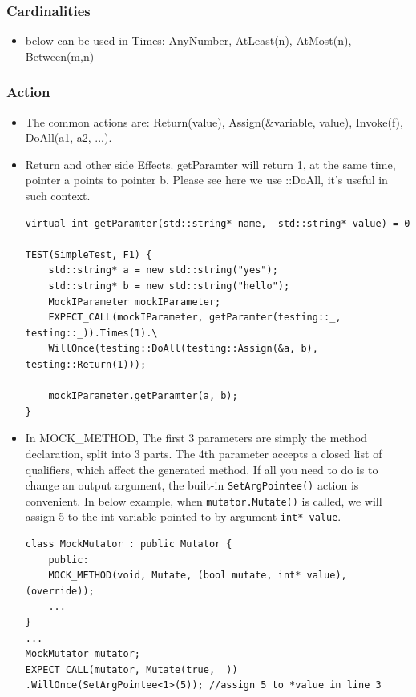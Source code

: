 \documentclass[a4paper,11pt,twoside]{book}
\begin{document}
\subsubsection{Cardinalities}
\begin{itemize}
	\item below can be used in Times: AnyNumber, AtLeast(n), AtMost(n), Between(m,n)
\end{itemize}

\subsubsection{Action}
\begin{itemize}
	\item The common actions are: Return(value), Assign(\&variable, value), Invoke(f), DoAll(a1, a2, ...). 
	
	\item Return and other side Effects. getParamter will return 1, at the same time, pointer a points to pointer b. Please see here we use ::DoAll, it's useful in such context. 
\begin{lstlisting}
virtual int getParamter(std::string* name,  std::string* value) = 0
	
TEST(SimpleTest, F1) {
	std::string* a = new std::string("yes");
	std::string* b = new std::string("hello");
	MockIParameter mockIParameter;
	EXPECT_CALL(mockIParameter, getParamter(testing::_, testing::_)).Times(1).\
	WillOnce(testing::DoAll(testing::Assign(&a, b), testing::Return(1)));
	
	mockIParameter.getParamter(a, b);
}
\end{lstlisting}

    \item In MOCK\_METHOD, The first 3 parameters are simply the method declaration, split into 3 parts. The 4th parameter accepts a closed list of qualifiers, which affect the generated method. If all you need to do is to change an output argument, the built-in \texttt{SetArgPointee()} action is convenient. In below example,  when \texttt{mutator.Mutate()} is called, we will assign 5 to the int variable pointed to by argument \texttt{int* value}. 
\begin{lstlisting}
class MockMutator : public Mutator {
	public:
	MOCK_METHOD(void, Mutate, (bool mutate, int* value), (override));
	...
}
...
MockMutator mutator;
EXPECT_CALL(mutator, Mutate(true, _))
.WillOnce(SetArgPointee<1>(5)); //assign 5 to *value in line 3
\end{lstlisting}
	

\end{itemize}
\end{document}
